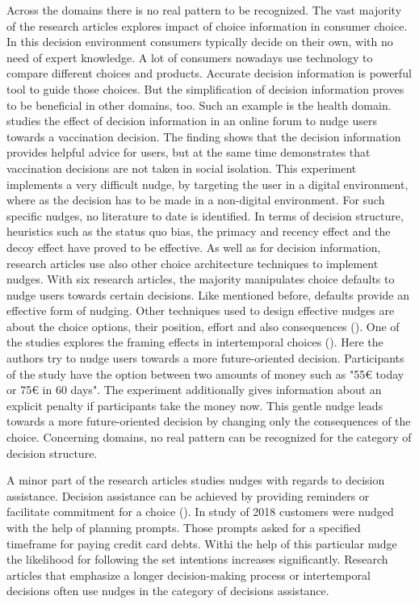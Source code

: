 Across the domains there is no real pattern to be recognized. The vast majority of the research articles explores impact of choice information in consumer choice. In this decision environment consumers typically decide on their own, with no need of expert knowledge. A lot of consumers nowadays use technology to compare different choices and products. Accurate decision information is powerful tool to guide those choices. 
But the simplification of decision information proves to be beneficial in other domains, too. Such an example is the health domain. \cite{langley_should_2015} studies the effect of decision information in an online forum to nudge users towards a vaccination decision. The finding shows that the decision information provides helpful advice for users, but at the same time demonstrates that vaccination decisions are not taken in social isolation. This experiment implements a very difficult nudge, by targeting the user in a digital environment, where as the decision has to be made in a non-digital environment. For such specific nudges, no literature to date is identified.
In terms of decision structure, heuristics such as the status quo bias, the primacy and recency effect and the decoy effect have proved to be effective. As well as for decision information, research articles use also other choice architecture techniques to implement nudges. With six research articles, the majority manipulates choice defaults to nudge users towards certain decisions. Like mentioned before, defaults provide an effective form of nudging. Other techniques used to design effective nudges are about the choice options, their position, effort and also consequences (\cite{munscher_review_2016}). One of the studies explores the framing effects in intertemporal choices (\cite{faralla_framing_2017}). Here the authors try to nudge users towards a more future-oriented decision. Participants of the study have the option between two amounts of money such as "55€ today or 75€ in 60 days". The experiment additionally gives information about an explicit penalty if participants take the money now. This gentle nudge leads towards a more future-oriented decision by changing only the consequences of the choice. Concerning domains, no real pattern can be recognized for the category of decision structure.

A minor part of the research articles studies nudges with regards to decision assistance. Decision assistance can be achieved by providing reminders or facilitate commitment for a choice (\cite{munscher_review_2016}). In study of 2018 customers were nudged with the help of planning prompts. Those prompts asked for a specified timeframe for paying credit card debts. Withi the help of this particular nudge the likelihood for following the set intentions increases significantly.
Research articles that emphasize a longer decision-making process or intertemporal decisions often use nudges in the category of decisions assistance.

